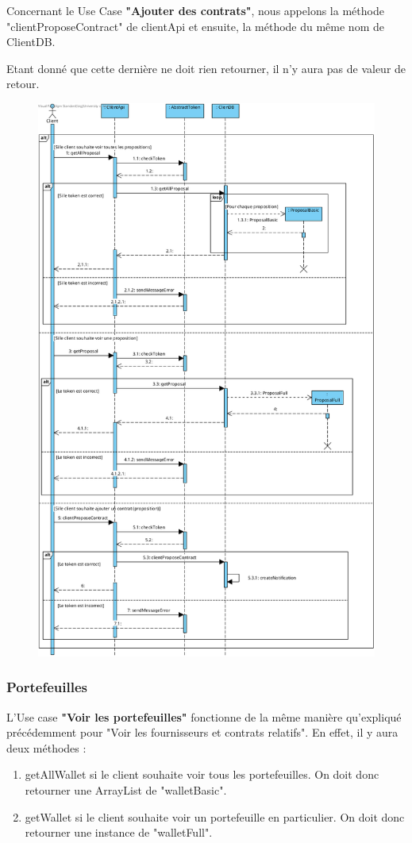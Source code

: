 \begin{flushleft}
Concernant le Use Case \textbf{"Ajouter des contrats"}, nous appelons la méthode "clientProposeContract" de clientApi et ensuite, la méthode du même nom de ClientDB.
\end{flushleft}

\begin{flushleft}
Etant donné que cette dernière ne doit rien retourner, il n'y aura pas de valeur de retour.
\end{flushleft}

\newpage
\begin{figure}[h]
\centering
\includegraphics[height = 1.2\textwidth]{Base/sequence/img/client/Voir les fournisseurs et contrats relatifs.png}
\end{figure}

\newpage

\subsubsection{Portefeuilles}
\begin{flushleft}
L'Use case \textbf{"Voir les portefeuilles"} fonctionne de la même manière qu'expliqué précédemment pour "Voir les fournisseurs et contrats relatifs".
En effet, il y aura deux méthodes : 
\end{flushleft}
\begin{enumerate}
\item getAllWallet si le client souhaite voir tous les portefeuilles. On doit donc retourner une ArrayList de "walletBasic".
\item getWallet si le client souhaite voir un portefeuille en particulier. On doit donc retourner une instance de "walletFull".
\end{enumerate}


